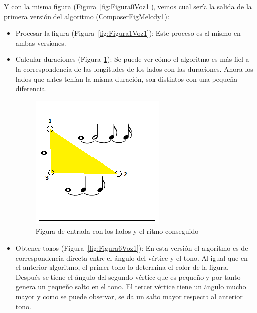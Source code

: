 Y con la misma figura (Figura~\ref{fig:Figura0Voz1}), vemos cual sería la salida de la primera versión del algoritmo (ComposerFigMelody1):

\begin{itemize}
	
	\item Procesar la figura (Figura~\ref{fig:Figura1Voz1}): Este proceso es el mismo en ambas versiones. \\
	
	\item Calcular duraciones (Figura~\ref{fig:Figura5Voz1}): Se puede ver cómo el algoritmo es más fiel a la correspondencia de las longitudes de los lados con las duraciones. Ahora los lados que antes tenían la misma duración, son distintos con una pequeña diferencia.\\
		
		\begin{figure}[htbp]
		\centering
		\hspace*{0.0in}
		\includegraphics[scale=1]{graphics/simpletest1-F2_2.png}
		\caption{Figura de entrada con los lados y el ritmo conseguido}
		\label{fig:Figura5Voz1}
		\end{figure}

	\item Obtener tonos  (Figura~\ref{fig:Figura6Voz1}): En esta versión el algoritmo es de correspondencia directa entre el ángulo del vértice y el tono. Al igual que en el anterior algoritmo, el primer tono lo determina el color de la figura. Después se tiene el ángulo del segundo vértice que es pequeño y por tanto genera un pequeño salto en el tono. El tercer vértice tiene un ángulo mucho mayor y como se puede observar, se da un salto mayor respecto al anterior tono.
	

\end{itemize}
